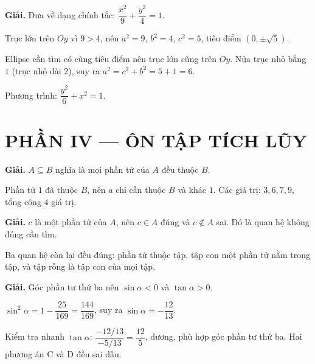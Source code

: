 \documentclass[11pt, a4paper]{article}
\begin{document}
\begin{dapan}[26 — Đáp án B]

\textbf{Giải.} Đưa về dạng chính tắc: $\dfrac{x^2}{9} + \dfrac{y^2}{4} = 1$.

Trục lớn trên $Oy$ vì $9 > 4$, nên $a^2 = 9$, $b^2 = 4$, $c^2 = 5$, tiêu điểm $(0,\pm\sqrt{5})$.

Ellipse cần tìm có cùng tiêu điểm nên trục lớn cũng trên $Oy$. Nửa trục nhỏ bằng $1$ (trục nhỏ dài $2$), suy ra $a^2 = c^2 + b^2 = 5 + 1 = 6$.

Phương trình: $\dfrac{y^2}{6} + x^2 = 1$.

\section{PHẦN IV — ÔN TẬP TÍCH LŨY}


\end{dapan}
\vspace{0.3cm}
\begin{dapan}[27 — Đáp án C]

\textbf{Giải.} $A \subseteq B$ nghĩa là mọi phần tử của $A$ đều thuộc $B$.

Phần tử $1$ đã thuộc $B$, nên $a$ chỉ cần thuộc $B$ và khác $1$. Các giá trị: $3, 6, 7, 9$, tổng cộng $4$ giá trị.


\end{dapan}
\vspace{0.3cm}
\begin{dapan}[28 — Đáp án D]

\textbf{Giải.} $c$ là một phần tử của $A$, nên $c \in A$ đúng và $c \notin A$ sai. Đó là quan hệ không đúng cần tìm.

Ba quan hệ còn lại đều đúng: phần tử thuộc tập, tập con một phần tử nằm trong tập, và tập rỗng là tập con của mọi tập.


\end{dapan}
\vspace{0.3cm}
\begin{dapan}[29 — Đáp án B]

\textbf{Giải.} Góc phần tư thứ ba nên $\sin\alpha < 0$ và $\tan\alpha > 0$.

$\sin^2\alpha = 1 - \dfrac{25}{169} = \dfrac{144}{169}$, suy ra $\sin\alpha = -\dfrac{12}{13}$.

Kiểm tra nhanh $\tan\alpha$: $\dfrac{-12/13}{-5/13} = \dfrac{12}{5}$, dương, phù hợp góc phần tư thứ ba. Hai phương án C và D đều sai dấu.


\end{dapan}
\end{document}
